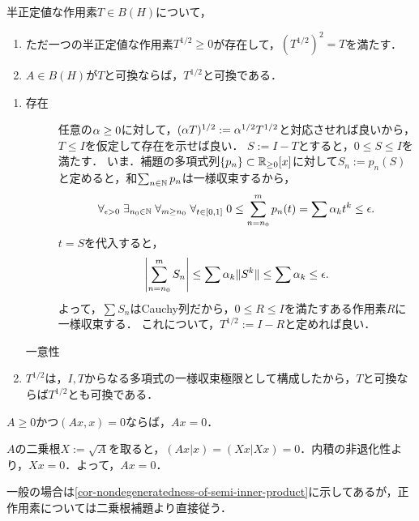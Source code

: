 \documentclass[uplatex,dvipdfmx]{jsreport}
\begin{document}
\begin{proposition}\label{prop-square-root-lemma}
    半正定値な作用素$T\in B(H)$について，
    \begin{enumerate}
        \item ただ一つの半正定値な作用素$T^{1/2}\ge0$が存在して，$(T^{1/2})^2=T$を満たす．
        \item $A\in B(H)$が$T$と可換ならば，$T^{1/2}$と可換である．
    \end{enumerate}
\end{proposition}
\begin{Proof}\mbox{}
    \begin{enumerate}
        \item 
        \begin{description}
            \item[存在] 任意の$\alpha\ge 0$に対して，$(\alpha T)^{1/2}:=\alpha^{1/2}T^{1/2}$と対応させれば良いから，$T\le I$を仮定して存在を示せば良い．
            $S:=I-T$とすると，$0\le S\le I$を満たす．
            いま．補題の多項式列$\{p_n\}\subset\mathbb{R}_{\ge 0}[x]$に対して$S_n:=p_n(S)$と定めると，和$\sum_{n\in\mathbb{N}}p_n$は一様収束するから，
            \[\forall_{\epsilon>0}\;\exists_{n_0\in\mathbb{N}}\;\forall_{m\ge n_0}\;\forall_{t\in[0,1]}\;0\le\sum_{n=n_0}^mp_n(t)=\sum\alpha_kt^k\le\epsilon.\]
            $t=S$を代入すると，
            \[\left|\sum^m_{n=n_0}S_n\right|\le\sum\alpha_k\|S^k\|\le\sum\alpha_k\le\epsilon.\]
            よって，$\sum S_n$はCauchy列だから，$0\le R\le I$を満たすある作用素$R$に一様収束する．
            これについて，$T^{1/2}:=I-R$と定めれば良い．
            \item[一意性]
        \end{description}
        \item $T^{1/2}$は，$I,T$からなる多項式の一様収束極限として構成したから，$T$と可換ならば$T^{1/2}$とも可換である．
    \end{enumerate}
\end{Proof}

\begin{corollary}
    $A\ge 0$かつ$(Ax,x)=0$ならば，$Ax=0$．
\end{corollary}
\begin{Proof}
    $A$の二乗根$X:=\sqrt{A}$を取ると，$(Ax|x)=(Xx|Xx)=0$．内積の非退化性より，$Xx=0$．よって，$Ax=0$．
\end{Proof}
\begin{remark}
    一般の場合は\ref{cor-nondegeneratedness-of-semi-inner-product}に示してあるが，正作用素については二乗根補題より直接従う．
\end{remark}
\end{document}
